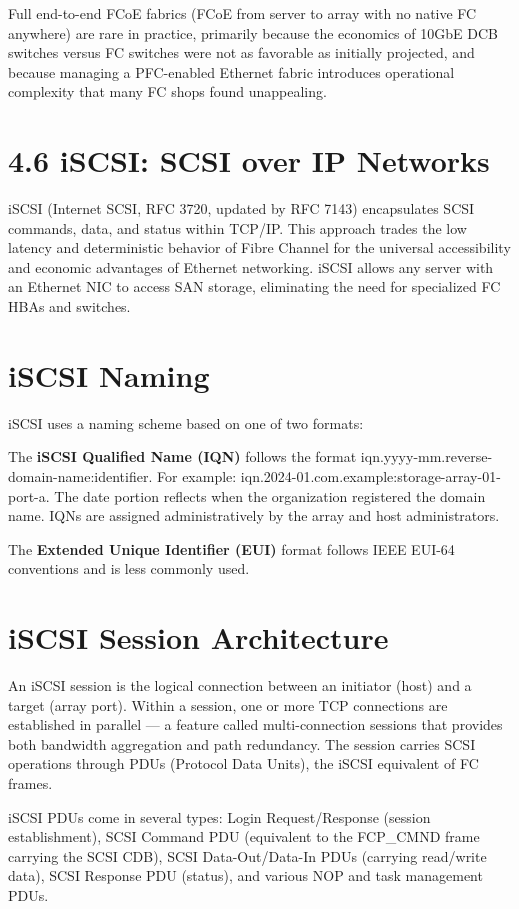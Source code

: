 Full end-to-end FCoE fabrics (FCoE from server to array with no native FC anywhere) are rare in practice, primarily because the economics of 10GbE DCB switches versus FC switches were not as favorable as initially projected, and because managing a PFC-enabled Ethernet fabric introduces operational complexity that many FC shops found unappealing.

\section{4.6 iSCSI: SCSI over IP Networks}
iSCSI (Internet SCSI, RFC 3720, updated by RFC 7143) encapsulates SCSI commands, data, and status within TCP/IP. This approach trades the low latency and deterministic behavior of Fibre Channel for the universal accessibility and economic advantages of Ethernet networking. iSCSI allows any server with an Ethernet NIC to access SAN storage, eliminating the need for specialized FC HBAs and switches.

\section{iSCSI Naming}
iSCSI uses a naming scheme based on one of two formats:

The \textbf{iSCSI Qualified Name (IQN)} follows the format iqn.yyyy-mm.reverse-domain-name:identifier. For example: iqn.2024-01.com.example:storage-array-01-port-a. The date portion reflects when the organization registered the domain name. IQNs are assigned administratively by the array and host administrators.

The \textbf{Extended Unique Identifier (EUI)} format follows IEEE EUI-64 conventions and is less commonly used.

\section{iSCSI Session Architecture}
An iSCSI session is the logical connection between an initiator (host) and a target (array port). Within a session, one or more TCP connections are established in parallel --- a feature called multi-connection sessions that provides both bandwidth aggregation and path redundancy. The session carries SCSI operations through PDUs (Protocol Data Units), the iSCSI equivalent of FC frames.

iSCSI PDUs come in several types: Login Request/Response (session establishment), SCSI Command PDU (equivalent to the FCP\_CMND frame carrying the SCSI CDB), SCSI Data-Out/Data-In PDUs (carrying read/write data), SCSI Response PDU (status), and various NOP and task management PDUs.


